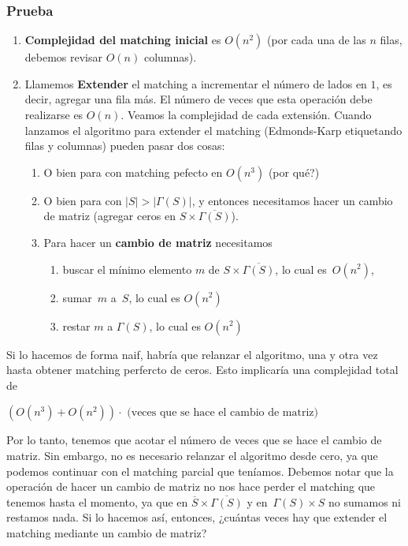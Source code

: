 \documentclass[10pt,a4paper]{article}
\begin{document}
\subsubsection*{Prueba}

\begin{enumerate}

	\item \textbf{Complejidad del matching inicial} es $O(n^2)$ (por cada una de las $n$ filas, debemos revisar $O(n)$ columnas).
	\item Llamemos \textbf{Extender }el matching a incrementar el número de lados en $1$, es decir, agregar una fila más. El número de veces que esta operación debe realizarse es $O(n)$. Veamos la complejidad de cada extensión. Cuando lanzamos el algoritmo para extender el matching (Edmonds-Karp etiquetando filas y columnas) pueden pasar dos cosas:
	\begin{enumerate}

		\item O bien para con matching pefecto en $O(n^3)$ (por qué?)
		\item O bien para con $\lvert S \rvert > \lvert \Gamma(S)\rvert$, y entonces necesitamos hacer un cambio de matriz (agregar ceros en $S \times \overline{\Gamma(S)}$).
		\item Para hacer un \textbf{cambio de matriz }necesitamos
		\begin{enumerate}

			\item buscar el mínimo elemento $m$ de $S \times \overline{\Gamma(S)}$, lo cual es $O(n^2)$,
			\item sumar $m$ a $S$, lo cual es $O(n^2)$
			\item restar $m$ a $\Gamma(S)$, lo cual es $O(n^2)$
		\end{enumerate}
		
	\end{enumerate}
	
\end{enumerate}

Si lo hacemos de forma naif, habría que relanzar el algoritmo, una y otra vez hasta obtener matching perfercto de ceros. Esto implicaría una complejidad total de

\begin{center}
$(O(n^3) + O(n^2))\cdot \text{ (veces que se hace el cambio de matriz)}$
\end{center}

Por lo tanto, tenemos que acotar el número de veces que se hace el cambio de matriz. Sin embargo, no es necesario relanzar el algoritmo desde cero, ya que podemos continuar con el matching parcial que teníamos. Debemos notar que la operación de hacer un cambio de matriz no nos hace perder el matching que tenemos hasta el momento, ya que en $\overline{S} \times \overline{\Gamma(S)}$ y en $\Gamma(S) \times S$ no sumamos ni restamos nada. Si lo hacemos así, entonces, ¿cuántas veces hay que extender el matching mediante un cambio de matriz?
\end{document}
